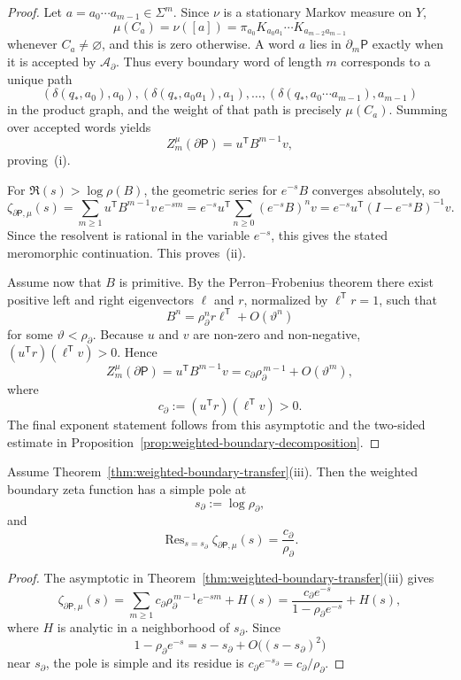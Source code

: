 \begin{proof}
Let \(a=a_0\cdots a_{m-1}\in\Sigma^m\).  Since \(\nu\) is a stationary
Markov measure on \(Y\),
\[
  \mu(C_a)=\nu([a])
  = \pi_{a_0}K_{a_0a_1}\cdots K_{a_{m-2}a_{m-1}}
\]
whenever \(C_a\neq\varnothing\), and this is zero otherwise.  A word
\(a\) lies in \(\partial_m\mathsf{P}\) exactly when it is accepted by
\(\mathcal{A}_\partial\).  Thus every boundary word of length \(m\)
corresponds to a unique path
\[
  (\delta(q_\ast,a_0),a_0),
  (\delta(q_\ast,a_0a_1),a_1),\ldots,
  (\delta(q_\ast,a_0\cdots a_{m-1}),a_{m-1})
\]
in the product graph, and the weight of that path is precisely
\(\mu(C_a)\).  Summing over accepted words yields
\[
  Z_m^\mu(\partial\mathsf{P})=u^{\mathsf T}B^{m-1}v,
\]
proving~(i).

For \(\Re(s)>\log\rho(B)\), the geometric series for
\(e^{-s}B\) converges absolutely, so
\[
  \zeta_{\partial\mathsf{P},\mu}(s)
  = \sum_{m\geq 1}
      u^{\mathsf T}B^{m-1}v\,e^{-sm}
  = e^{-s}u^{\mathsf T}
    \sum_{n\geq 0}(e^{-s}B)^n v
  = e^{-s}u^{\mathsf T}(I-e^{-s}B)^{-1}v.
\]
Since the resolvent is rational in the variable \(e^{-s}\), this gives
the stated meromorphic continuation.  This proves~(ii).

Assume now that \(B\) is primitive.  By the Perron--Frobenius theorem
there exist positive left and right eigenvectors \(\ell\) and \(r\),
normalized by \(\ell^{\mathsf T}r=1\), such that
\[
  B^n = \rho_\partial^n r\ell^{\mathsf T} + O(\vartheta^n)
\]
for some \(\vartheta<\rho_\partial\).  Because \(u\) and \(v\) are
non-zero and non-negative, \((u^{\mathsf T}r)(\ell^{\mathsf T}v)>0\).
Hence
\[
  Z_m^\mu(\partial\mathsf{P})
  = u^{\mathsf T}B^{m-1}v
  = c_\partial\rho_\partial^{\,m-1}+O(\vartheta^m),
\]
where
\[
  c_\partial := (u^{\mathsf T}r)(\ell^{\mathsf T}v)>0.
\]
The final exponent statement follows from this asymptotic and the
two-sided estimate in
Proposition~\ref{prop:weighted-boundary-decomposition}.
\end{proof}

\begin{corollary}
\label{cor:weighted-boundary-pole}
Assume
Theorem~\ref{thm:weighted-boundary-transfer}(iii).  Then the weighted
boundary zeta function has a simple pole at
\[
  s_\partial := \log\rho_\partial,
\]
and
\[
  \operatorname{Res}_{s=s_\partial}
  \zeta_{\partial\mathsf{P},\mu}(s)
  = \frac{c_\partial}{\rho_\partial}.
\]
\end{corollary}

\begin{proof}
The asymptotic in
Theorem~\ref{thm:weighted-boundary-transfer}(iii) gives
\[
  \zeta_{\partial\mathsf{P},\mu}(s)
  = \sum_{m\geq 1}
      c_\partial\rho_\partial^{\,m-1}e^{-sm}
    + H(s)
  = \frac{c_\partial e^{-s}}
         {1-\rho_\partial e^{-s}}
    + H(s),
\]
where \(H\) is analytic in a neighborhood of \(s_\partial\).  Since
\[
  1-\rho_\partial e^{-s}
  = s-s_\partial + O\bigl((s-s_\partial)^2\bigr)
\]
near \(s_\partial\), the pole is simple and its residue is
\(c_\partial e^{-s_\partial}=c_\partial/\rho_\partial\).
\end{proof}

